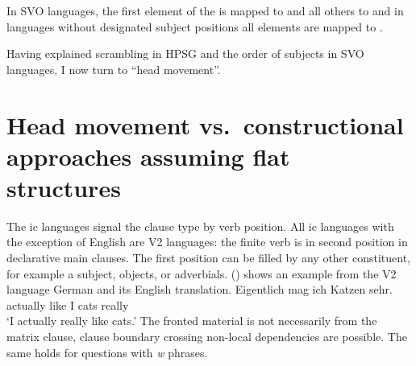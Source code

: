 \documentclass[output=paper]{langsci/langscibook}
\begin{document}
\z
In SVO languages, the first element of the \argstl is mapped to \spr and all others to \comps and in
languages without designated subject positions all \argst elements are mapped to \comps.

Having explained scrambling in HPSG and the order of subjects in SVO languages, I now turn to ``head movement''.



\section{Head movement vs.\ constructional approaches assuming flat structures}
\label{sec-head-movement-vs-flat}


The ic languages signal the clause type by verb position. All ic languages with the
exception of English are V2 languages: the finite verb is in second position in declarative main
clauses. The first position can be filled by any other constituent, for example a subject,
objects, or adverbials. () shows an example from the V2 language German and its English translation.
\ea 
\gll Eigentlich mag ich Katzen sehr.\\
     actually   like I cats really\\
\glt `I actually really like cats.'
\z
The fronted material is not necessarily from the matrix clause, clause boundary
crossing non-local dependencies are possible. The same holds for questions with \emph{w} phrases. 
\end{document}
